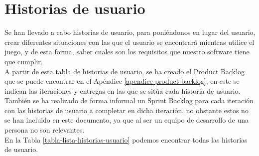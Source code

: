 
\section{Historias de usuario}
Se han llevado a cabo historias de usuario, para poniéndonos en lugar del usuario, crear diferentes situaciones con las que el usuario se encontrará mientras utilice el juego, y de esta forma, saber cuales son los requisitos que nuestro software tiene que cumplir.\\

A partir de esta tabla de historias de usuario, se ha creado el Product Backlog que se puede encontrar en el Apéndice \ref{apendice-product-backlog}, en este se indican las iteraciones y entregas en las que se sitúa cada historia de usuario.\\

También se ha realizado de forma informal un Sprint Backlog para cada iteración con las historias de usuario a completar en dicha iteración, no obstante estos no se han incluido en este documento, ya que al ser un equipo de desarrollo de una persona no son relevantes.\\

En la Tabla \ref{tabla-lista-historias-usuario} podemos encontrar todas las historias de usuario.


